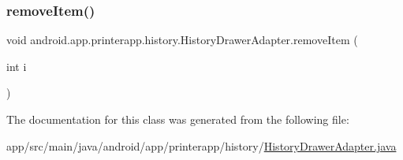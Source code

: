 \subsubsection{\texorpdfstring{remove\+Item()}{removeItem()}}
{\footnotesize\ttfamily void android.\+app.\+printerapp.\+history.\+History\+Drawer\+Adapter.\+remove\+Item (\begin{DoxyParamCaption}\item[{int}]{i }\end{DoxyParamCaption})}



The documentation for this class was generated from the following file\+:\begin{DoxyCompactItemize}
\item 
app/src/main/java/android/app/printerapp/history/\hyperlink{_history_drawer_adapter_8java}{History\+Drawer\+Adapter.\+java}\end{DoxyCompactItemize}

